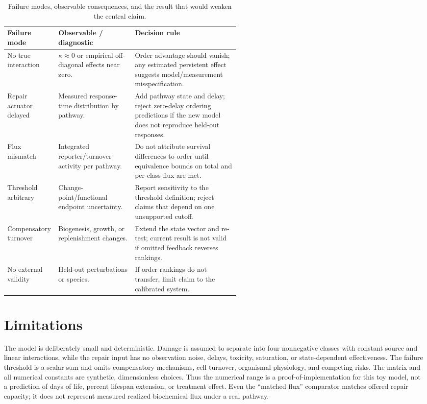 \documentclass[10pt,letterpaper]{article}
\begin{document}
\begin{table}[H]
\centering\small
\caption{Failure modes, observable consequences, and the result that would weaken the central claim.}
\label{tab:falsification}
\begin{tabularx}{\linewidth}{p{0.22\linewidth}p{0.33\linewidth}X}
\toprule
\textbf{Failure mode} & \textbf{Observable / diagnostic} & \textbf{Decision rule}\\
\midrule
No true interaction & $\kappa\approx0$ or empirical off-diagonal effects near zero. & Order advantage should vanish; any estimated persistent effect suggests model/measurement misspecification.\\
Repair actuator delayed & Measured response-time distribution by pathway. & Add pathway state and delay; reject zero-delay ordering predictions if the new model does not reproduce held-out responses.\\
Flux mismatch & Integrated reporter/turnover activity per pathway. & Do not attribute survival differences to order until equivalence bounds on total and per-class flux are met.\\
Threshold arbitrary & Change-point/functional endpoint uncertainty. & Report sensitivity to the threshold definition; reject claims that depend on one unsupported cutoff.\\
Compensatory turnover & Biogenesis, growth, or replenishment changes. & Extend the state vector and re-test; current result is not valid if omitted feedback reverses rankings.\\
No external validity & Held-out perturbations or species. & If order rankings do not transfer, limit claim to the calibrated system.\\
\bottomrule
\end{tabularx}
\end{table}

\section{Limitations}
The model is deliberately small and deterministic. Damage is assumed to separate into four nonnegative classes with constant source and linear interactions, while the repair input has no observation noise, delays, toxicity, saturation, or state-dependent effectiveness. The failure threshold is a scalar sum and omits compensatory mechanisms, cell turnover, organismal physiology, and competing risks. The matrix and all numerical constants are synthetic, dimensionless choices. Thus the numerical range is a proof-of-implementation for this toy model, not a prediction of days of life, percent lifespan extension, or treatment effect. Even the “matched flux” comparator matches offered repair capacity; it does not represent measured realized biochemical flux under a real pathway.
\end{document}
